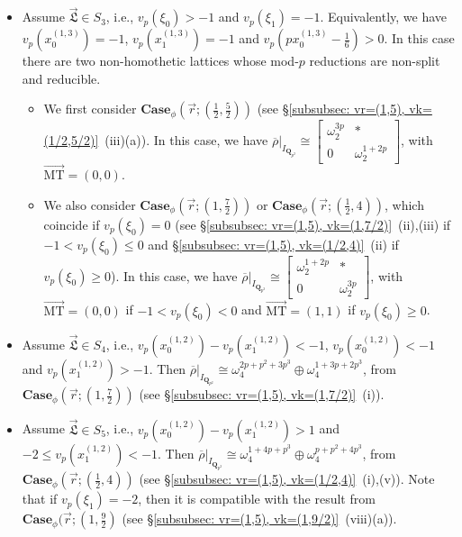 \documentclass[11pt]{amsart}
\theoremstyle{definition}
\numberwithin{equation}{subsection}
\theoremstyle{plain}
\theoremstyle{plain}
\theoremstyle{plain}
\theoremstyle{plain}
\theoremstyle{plain}
\theoremstyle{plain}
\theoremstyle{plain}
\theoremstyle{plain}
\theoremstyle{plain}
\theoremstyle{plain}
\theoremstyle{plain}
\theoremstyle{plain}
\theoremstyle{definition}
\theoremstyle{definition}
\theoremstyle{definition}
\theoremstyle{remark}
\renewcommand{\(}{\textup{(}}
\renewcommand{\)}{\textup{)}}
\newcommand{\Q}{\mathbf{Q}}
\newcommand{\rhobar}{\overline{\rho}}
\newcommand{\fL}{\mathfrak{L}}
\newcommand{\vr}{\vec{r}}
\newcommand{\vL}{\vec{\fL}}
\newcommand{\IQptwo}{{I_{\Q_{p^2}}}}
\begin{document}
\begin{itemize}[leftmargin=*]
\item Assume $\vL\in S_3$, i.e., $v_p(\xi_0)>-1$ and $v_p(\xi_1)=-1$. Equivalently, we have $v_p(x_0^{(1,3)})=-1$, $v_p(x_1^{(1,3)})=-1$ and $v_p(px_0^{(1,3)}-\frac{1}{6})>0$. In this case there are two non-homothetic lattices whose mod-$p$ reductions are non-split and reducible.
\begin{itemize}[leftmargin=*]
    \item We first consider $\mathbf{Case}_\phi(\vr;(\frac{1}{2},\frac{5}{2}))$ (see \S\ref{subsubsec: vr=(1,5), vk=(1/2,5/2)}~(iii)(a)). In this case, we have $\rhobar|_\IQptwo\cong
    \begin{bmatrix}
        \omega_2^{3p} & * \\ 0 & \omega_2^{1+2p}
    \end{bmatrix}$, with $\vec{\mathrm{MT}}=(0,0)$.
    \item We also consider $\mathbf{Case}_\phi(\vr;(1,\frac{7}{2}))$ or $\mathbf{Case}_\phi(\vr;(\frac{1}{2},4))$, which coincide if $v_p(\xi_0)=0$ (see \S\ref{subsubsec: vr=(1,5), vk=(1,7/2)}~(ii),(iii) if $-1<v_p(\xi_0)\leq 0$ and \S\ref{subsubsec: vr=(1,5), vk=(1/2,4)}~(ii) if $v_p(\xi_0)\geq 0$). In this case, we have $\rhobar|_\IQptwo\cong
    \begin{bmatrix}
        \omega_2^{1+2p} & * \\ 0 & \omega_2^{3p}
    \end{bmatrix}$, with $\vec{\mathrm{MT}}=(0,0)$ if $-1<v_p(\xi_0)<0$ and $\vec{\mathrm{MT}}=(1,1)$ if $v_p(\xi_0)\geq 0$.
\end{itemize}

\item Assume $\vL\in S_4$, i.e., $v_p(x_0^{(1,2)})-v_p(x_1^{(1,2)})<-1$, $v_p(x_0^{(1,2)})<-1$ and $v_p(x_1^{(1,2)})>-1$. Then $\rhobar|_\IQptwo\cong\omega_4^{2p+p^2+3p^3}\oplus\omega_4^{1+3p+2p^3}$, from $\mathbf{Case}_\phi(\vr;(1,\frac{7}{2}))$ (see \S\ref{subsubsec: vr=(1,5), vk=(1,7/2)}~(i)).

\item Assume $\vL\in S_5$, i.e., $v_p(x_0^{(1,2)})-v_p(x_1^{(1,2)})>1$ and $-2\leq v_p(x_1^{(1,2)})<-1$. Then $\rhobar|_\IQptwo\cong\omega_4^{1+4p+p^3}\oplus\omega_4^{p+p^2+4p^3}$, from $\mathbf{Case}_\phi(\vr;(\frac{1}{2},4))$ (see \S\ref{subsubsec: vr=(1,5), vk=(1/2,4)}~(i),(v)). Note that if $v_p(\xi_1)=-2$, then it is compatible with the result from $\mathbf{Case}_\phi(\vr;(1,\frac{9}{2})$ (see \S\ref{subsubsec: vr=(1,5), vk=(1,9/2)}~(viii)(a)).


\end{itemize}
\end{document}
